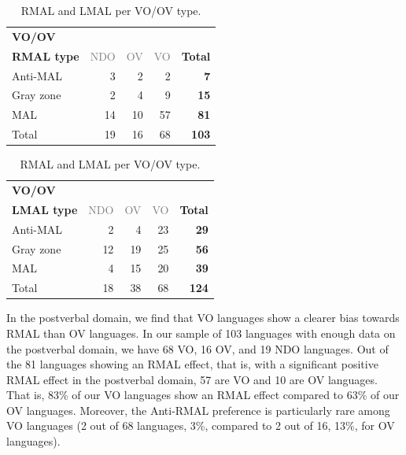 \begin{table}[!ht]
\begin{center}
\begin{tabular}{l r r r r}
\toprule
\textbf{VO/OV} & & & & \\
\textbf{RMAL type} & \textcolor{gray}{NDO} & \textcolor{gray}{OV} & \textcolor{gray}{VO} & \textcolor{totalgreen}{\textbf{Total}} \\
\midrule
\rowcolor{rowred} Anti-MAL & 3 & 2 & 2 & \textcolor{totalgreen}{\textbf{7}} \\
\rowcolor{rowyellow} Gray zone & 2 & 4 & 9 & \textcolor{totalgreen}{\textbf{15}} \\
\rowcolor{rowgreen} MAL & 14 & 10 & 57 & \textcolor{totalgreen}{\textbf{81}} \\
\rowcolor{rowgray} Total & 19 & 16 & 68 & \textcolor{totalgreen}{\textbf{103}} \\
\bottomrule
\end{tabular}


\vspace{6pt}

\begin{tabular}{l r r r r}
\toprule
\textbf{VO/OV} & & & & \\
\textbf{LMAL type} & \textcolor{gray}{NDO} & \textcolor{gray}{OV} & \textcolor{gray}{VO} & \textcolor{totalgreen}{\textbf{Total}} \\
\midrule
\rowcolor{rowred} Anti-MAL & 2 & 4 & 23 & \textcolor{totalgreen}{\textbf{29}} \\
\rowcolor{rowyellow} Gray zone & 12 & 19 & 25 & \textcolor{totalgreen}{\textbf{56}} \\
\rowcolor{rowgreen} MAL & 4 & 15 & 20 & \textcolor{totalgreen}{\textbf{39}} \\
\rowcolor{rowgray} Total & 18 & 38 & 68 & \textcolor{totalgreen}{\textbf{124}} \\
\bottomrule
\end{tabular}
\caption{RMAL and LMAL per VO/OV type.}
\label{tab:HeadLR}
\end{center}
\end{table}

In the postverbal domain, we find that VO languages show a clearer bias towards RMAL than OV languages. In our sample of 103 languages with enough data on the postverbal domain, we have 68 VO, 16 OV, and 19 NDO languages.  Out of the 81 languages showing an RMAL effect, that is, with a significant positive RMAL effect in the postverbal domain, 57 are VO and 10 are OV languages. That is, 83\% of our VO languages show an RMAL effect compared to 63\% of our OV languages.
Moreover, the Anti-RMAL preference is particularly rare among VO languages (2 out of 68 languages, 3\%, compared to 2 out of 16, 13\%, for OV languages). 

